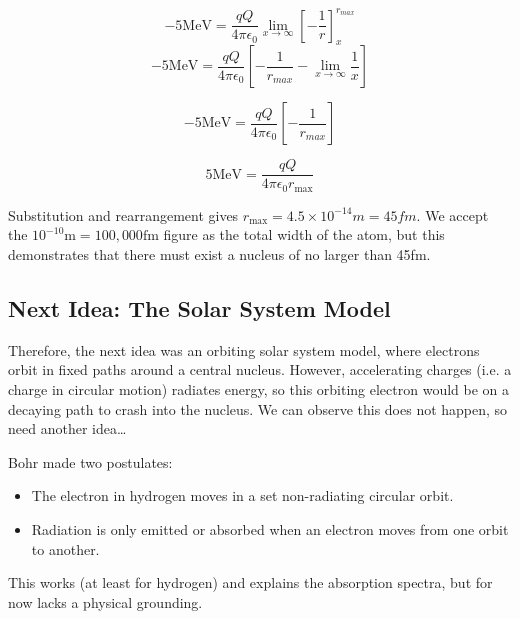 \[
    -5 \text{MeV} = \frac{qQ}{4 \pi \epsilon_0} \lim_{x \to \infty} \left[ - \frac{1}{r}\right]^{r_{max}}_x
\]
\[
    -5 \text{MeV} = \frac{qQ}{4 \pi \epsilon_0} \left[ -\frac{1}{r_{max}} - \lim_{x \to \infty} \frac{1}{x}\right]
\]

\[
    -5 \text{MeV} = \frac{qQ}{4 \pi \epsilon_0} \left[ -\frac{1}{r_{max}}\right]
\]

\[
    5 \text{MeV} = \frac{qQ}{4 \pi \epsilon_0 r_{\text{max}}}
\]

Substitution and rearrangement gives $r_{\text{max}} = 4.5 \times 10^{-14}m = 45fm$.
We accept the $10^{-10}\text{m} = 100,000 \text{fm}$ figure as the total width of the atom, but this demonstrates that there must exist a nucleus of no larger than 45fm.

\subsection*{Next Idea: The Solar System Model}
Therefore, the next idea was an orbiting solar system model, where electrons orbit in fixed paths around a central nucleus. However, accelerating charges (i.e. a charge in circular motion) radiates energy, so this orbiting electron would be on a decaying path to crash into the nucleus. We can observe this does not happen, so need another idea\dots

Bohr made two postulates:
\begin{itemize}
    \item The electron in hydrogen moves in a set non-radiating circular orbit.
    \item Radiation is only emitted or absorbed when an electron moves from one orbit to another.
\end{itemize}

This works (at least for hydrogen) and explains the absorption spectra, but for now lacks a physical grounding.